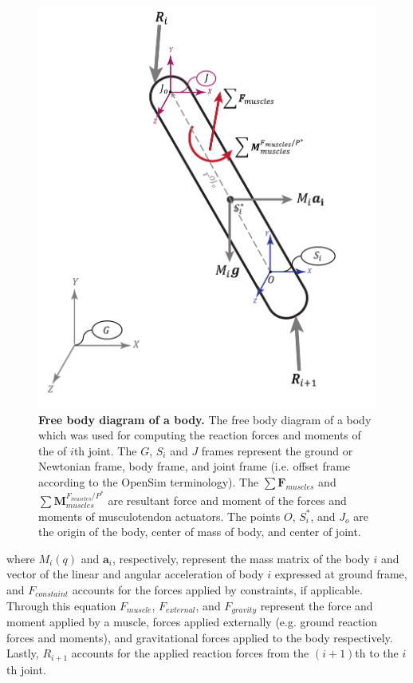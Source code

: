 \documentclass[10pt,letterpaper]{article}
\begin{document}
\begin{figure}[!t]
	\centering
	\includegraphics[scale=0.35]{Cartoons/JointReactionForce_FBD.pdf} 
	\caption{\small{\textbf{Free body diagram of a body.} The free body diagram of a body which was used for computing the reaction forces and moments of the of $i$th joint. The $G$, $S_i$ and $J$ frames represent the ground or Newtonian frame, body frame, and joint frame (i.e. offset frame according to the OpenSim terminology). The $\sum\mathbf{F}_{muscles}$ and  $\sum\mathbf{M}^{F_{muscles}/P^*}_{muscles}$ are resultant force and moment of the forces and moments of musculotendon actuators. The points $O$, $S^*_i$, and $J_o$ are the origin of the body, center of mass of body, and center of joint. }}
	\label{Fig_JRF_FBD}
\end{figure}
where $M_i(q)$ and ${\mathit{\mathbf{a}}}_i$, respectively, represent the mass matrix of the body $i$ and vector of the linear and angular acceleration of body $i$ expressed at ground frame, and $F_{constaint}$ accounts for the forces applied by constraints, if applicable. Through this equation $F_{muscle}$, $F_{external}$, and $F_{gravity}$ represent the force and moment applied by a muscle, forces applied externally (e.g. ground reaction forces and moments), and gravitational forces applied to the body respectively. Lastly, $R_{i+1}$ accounts for the applied reaction forces from the $(i+1)$th to the $i$th joint.\\
\end{document}
